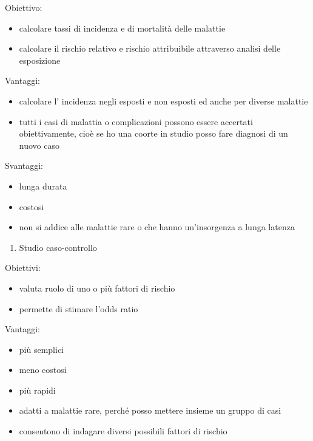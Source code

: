 Obiettivo:

\begin{itemize}
\item
  calcolare tassi di incidenza e di mortalità delle malattie
\item
  calcolare il rischio relativo e rischio attribuibile attraverso
  analisi delle esposizione
\end{itemize}

Vantaggi:

\begin{itemize}
\item
  calcolare l' incidenza negli esposti e non esposti ed anche per
  diverse malattie
\item
  tutti i casi di malattia o complicazioni possono essere accertati
  obiettivamente, cioè se ho una coorte in studio posso fare diagnosi di
  un nuovo caso
\end{itemize}

Svantaggi:

\begin{itemize}
\item
  lunga durata
\item
  costosi
\item
  non si addice alle malattie rare o che hanno un'insorgenza a lunga
  latenza
\end{itemize}

\begin{enumerate}
\def\labelenumi{\arabic{enumi}.}
\item
  Studio caso-controllo
\end{enumerate}

Obiettivi:

\begin{itemize}
\item
  valuta ruolo di uno o più fattori di rischio
\item
  permette di stimare l'odds ratio
\end{itemize}

Vantaggi:

\begin{itemize}
\item
  più semplici
\item
  meno costosi
\item
  più rapidi
\item
  adatti a malattie rare, perché posso mettere insieme un gruppo di casi
\item
  consentono di indagare diversi possibili fattori di rischio
\end{itemize}

